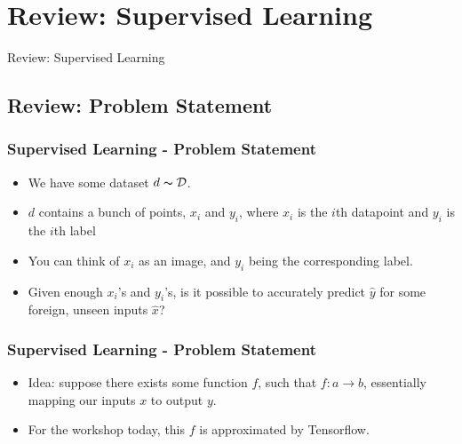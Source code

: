 \documentclass{beamer}
\begin{document}
\section{Review: Supervised Learning}

\begin{frame}
  \Huge{\centerline{Review: Supervised Learning}}
\end{frame}

\subsection{Review: Problem Statement}
\begin{frame}
  \frametitle{Supervised Learning - Problem Statement}
  \begin{itemize}
  \item We have some dataset $d \thicksim \mathcal{D}$.
  \item $d$ contains a bunch of points, $x_i$ and $y_i$, where $x_i$ is the $i$th datapoint and $y_i$ is the $i$th label
  \item You can think of $x_i$ as an image, and $y_i$ being the corresponding label.
  \item Given enough $x_i$'s and $y_i$'s, is it possible to accurately predict $\hat{y}$ for some foreign, unseen inputs $\hat{x}$?
  \end{itemize}
\end{frame}

\begin{frame}
  \frametitle{Supervised Learning - Problem Statement}
  \begin{itemize}
  \item Idea: suppose there exists some function $f$, such that $f: a \rightarrow b$, essentially mapping our inputs $x$ to output $y$.
  \item For the workshop today, this $f$ is approximated by Tensorflow.
  \end{itemize}
\end{frame}
\end{document}
